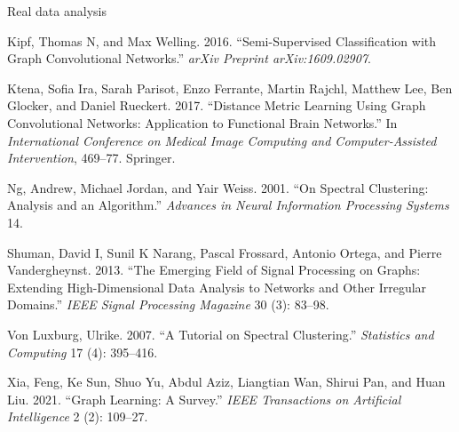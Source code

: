 \documentclass[
  ignorenonframetext,
]{beamer}
\newlength{\cslhangindent}
\newenvironment{CSLReferences}[2] %
 {\begin{list}{}{%
  \setlength{\itemindent}{0pt}
  \setlength{\leftmargin}{0pt}
  \setlength{\parsep}{0pt}
  \ifodd #1
   \setlength{\leftmargin}{\cslhangindent}
   \setlength{\itemindent}{-1\cslhangindent}
  \fi
  \setlength{\itemsep}{#2\baselineskip}}}
 {\end{list}}
\begin{document}
\begin{frame}{Real data analysis}
\begin{CSLReferences}{1}{0}
Kipf, Thomas N, and Max Welling. 2016. {``Semi-Supervised Classification
with Graph Convolutional Networks.''} \emph{arXiv Preprint
arXiv:1609.02907}.

Ktena, Sofia Ira, Sarah Parisot, Enzo Ferrante, Martin Rajchl, Matthew
Lee, Ben Glocker, and Daniel Rueckert. 2017. {``Distance Metric Learning
Using Graph Convolutional Networks: Application to Functional Brain
Networks.''} In \emph{International Conference on Medical Image
Computing and Computer-Assisted Intervention}, 469--77. Springer.

Ng, Andrew, Michael Jordan, and Yair Weiss. 2001. {``On Spectral
Clustering: Analysis and an Algorithm.''} \emph{Advances in Neural
Information Processing Systems} 14.

Shuman, David I, Sunil K Narang, Pascal Frossard, Antonio Ortega, and
Pierre Vandergheynst. 2013. {``The Emerging Field of Signal Processing
on Graphs: Extending High-Dimensional Data Analysis to Networks and
Other Irregular Domains.''} \emph{IEEE Signal Processing Magazine} 30
(3): 83--98.

Von Luxburg, Ulrike. 2007. {``A Tutorial on Spectral Clustering.''}
\emph{Statistics and Computing} 17 (4): 395--416.

Xia, Feng, Ke Sun, Shuo Yu, Abdul Aziz, Liangtian Wan, Shirui Pan, and
Huan Liu. 2021. {``Graph Learning: A Survey.''} \emph{IEEE Transactions
on Artificial Intelligence} 2 (2): 109--27.

\end{CSLReferences}
\end{frame}
\end{document}
